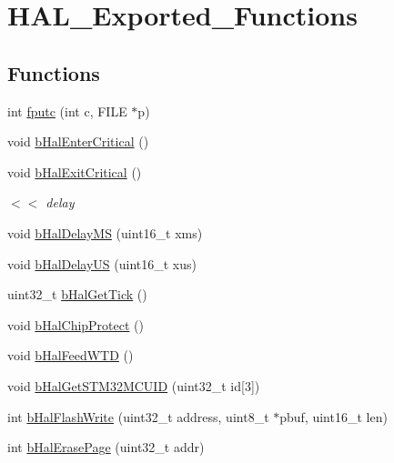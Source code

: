 \hypertarget{group___h_a_l___exported___functions}{}\section{H\+A\+L\+\_\+\+Exported\+\_\+\+Functions}
\label{group___h_a_l___exported___functions}
\subsection*{Functions}
\begin{DoxyCompactItemize}
\item 
int \mbox{\hyperlink{group___h_a_l___exported___functions_gaf709c07e26adbffa5d9984b2cec63c69}{fputc}} (int c, F\+I\+LE $\ast$p)
\item 
void \mbox{\hyperlink{group___h_a_l___exported___functions_gac4b3d313f1c9c001234743725e491b9a}{b\+Hal\+Enter\+Critical}} ()
\item 
void \mbox{\hyperlink{group___h_a_l___exported___functions_ga9b005cf96b043e836780e1cc1b9254fc}{b\+Hal\+Exit\+Critical}} ()
\begin{DoxyCompactList}\small\item\em $<$$<$ delay \end{DoxyCompactList}\item 
void \mbox{\hyperlink{group___h_a_l___exported___functions_ga12c2eefdfcc84de397bba9c9f95882a5}{b\+Hal\+Delay\+MS}} (uint16\+\_\+t xms)
\item 
void \mbox{\hyperlink{group___h_a_l___exported___functions_ga252916ffe00f5745ac44905b50a3f412}{b\+Hal\+Delay\+US}} (uint16\+\_\+t xus)
\item 
uint32\+\_\+t \mbox{\hyperlink{group___h_a_l___exported___functions_gac8e750b2b439b1cc756a4076503738e4}{b\+Hal\+Get\+Tick}} ()
\item 
void \mbox{\hyperlink{group___h_a_l___exported___functions_ga6bb2b0cf5092883eb8c51f9b8d4a5c78}{b\+Hal\+Chip\+Protect}} ()
\item 
void \mbox{\hyperlink{group___h_a_l___exported___functions_ga6f935a31e0b1cdb5905b565a5d3bb72f}{b\+Hal\+Feed\+W\+TD}} ()
\item 
void \mbox{\hyperlink{group___h_a_l___exported___functions_gab4fede695cd2bf0ead21a2cc4ac02aaa}{b\+Hal\+Get\+S\+T\+M32\+M\+C\+U\+ID}} (uint32\+\_\+t id\mbox{[}3\mbox{]})
\item 
int \mbox{\hyperlink{group___h_a_l___exported___functions_ga19179b3668da8153a34f5c57a43cef0b}{b\+Hal\+Flash\+Write}} (uint32\+\_\+t address, uint8\+\_\+t $\ast$pbuf, uint16\+\_\+t len)
\item 
int \mbox{\hyperlink{group___h_a_l___exported___functions_ga9bbf639675e6f6028a969874d60acac3}{b\+Hal\+Erase\+Page}} (uint32\+\_\+t addr)
\end{DoxyCompactItemize}


